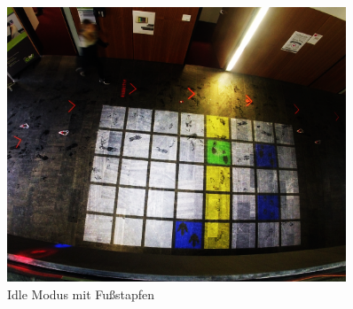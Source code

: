 \begin{figure}[htbp]
	\centering
		\includegraphics[width=0.9\textwidth]{images/IdleAni.png}
	\caption{Idle Modus mit Fußstapfen}
	\label{fig:IdleAni}
\end{figure}